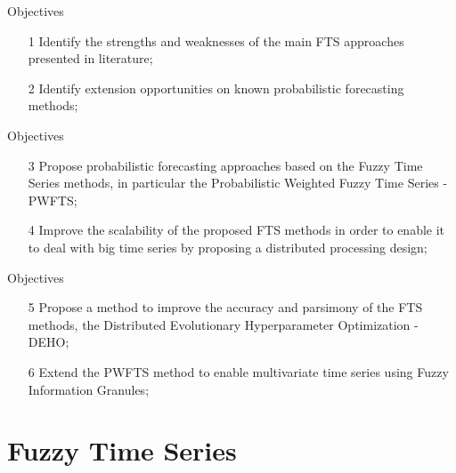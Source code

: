 \documentclass{beamer}
\begin{document}


\begin{frame}{Objectives}
\linespread{2}
\begin{enumerate}
\item[1] Identify the strengths and weaknesses of the main FTS approaches presented in literature;
\item[2] Identify extension opportunities on known probabilistic forecasting methods;
\end{enumerate}
\end{frame}



\begin{frame}{Objectives}
\linespread{2}
\begin{enumerate}
\item[3] Propose probabilistic forecasting approaches based on the Fuzzy Time Series methods, in particular the Probabilistic Weighted Fuzzy Time Series - PWFTS;
\item[4] Improve the scalability of the proposed FTS methods in order to enable it to deal with big time series by proposing a distributed processing design;
\end{enumerate}
\end{frame}


\begin{frame}{Objectives}
\linespread{2}
\begin{enumerate}
\item[5] Propose a method to improve the accuracy and parsimony of the FTS methods, the Distributed Evolutionary Hyperparameter Optimization - DEHO;
\item[6] Extend the PWFTS method to enable multivariate time series using Fuzzy Information Granules;
\end{enumerate}
\end{frame}


\section{Fuzzy Time Series}
\end{document}
